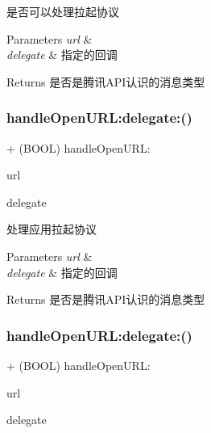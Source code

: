 是否可以处理拉起协议 
\begin{DoxyParams}{Parameters}
{\em url} & \\
\hline
{\em delegate} & 指定的回调 \\
\hline
\end{DoxyParams}
\begin{DoxyReturn}{Returns}
是否是腾讯\+A\+P\+I认识的消息类型 
\end{DoxyReturn}
\mbox{\label{interface_tencent_api_interface_a3c0606f58a848dcfa3f76e11f8046612}} 
\subsubsection{\texorpdfstring{handle\+Open\+U\+R\+L\+:delegate\+:()}{handleOpenURL:delegate:()}\hspace{0.1cm}{\footnotesize\ttfamily [1/2]}}
{\footnotesize\ttfamily + (B\+O\+OL) handle\+Open\+U\+R\+L\+: \begin{DoxyParamCaption}\item[{(N\+S\+U\+RL $\ast$)}]{url }\item[{delegate:(id$<$ Tencent\+Api\+Interface\+Delegate $>$)}]{delegate }\end{DoxyParamCaption}}

处理应用拉起协议 
\begin{DoxyParams}{Parameters}
{\em url} & \\
\hline
{\em delegate} & 指定的回调 \\
\hline
\end{DoxyParams}
\begin{DoxyReturn}{Returns}
是否是腾讯\+A\+P\+I认识的消息类型 
\end{DoxyReturn}
\mbox{\label{interface_tencent_api_interface_a3c0606f58a848dcfa3f76e11f8046612}} 
\subsubsection{\texorpdfstring{handle\+Open\+U\+R\+L\+:delegate\+:()}{handleOpenURL:delegate:()}\hspace{0.1cm}{\footnotesize\ttfamily [2/2]}}
{\footnotesize\ttfamily + (B\+O\+OL) handle\+Open\+U\+R\+L\+: \begin{DoxyParamCaption}\item[{(N\+S\+U\+RL $\ast$)}]{url }\item[{delegate:(id$<$ Tencent\+Api\+Interface\+Delegate $>$)}]{delegate }\end{DoxyParamCaption}}


